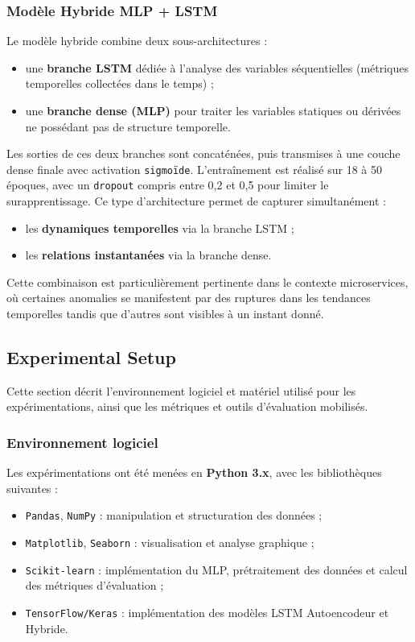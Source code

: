 \documentclass[conference]{IEEEtran}
\begin{document}
\subsubsection{Modèle Hybride MLP + LSTM}
Le modèle hybride combine deux sous-architectures :
\begin{itemize}
    \item une \textbf{branche LSTM} dédiée à l’analyse des variables séquentielles (métriques temporelles collectées dans le temps) ;
    \item une \textbf{branche dense (MLP)} pour traiter les variables statiques ou dérivées ne possédant pas de structure temporelle.
\end{itemize}
Les sorties de ces deux branches sont concaténées, puis transmises à une couche dense finale avec activation \texttt{sigmoïde}.
L’entraînement est réalisé sur 18 à 50 époques, avec un \texttt{dropout} compris entre 0,2 et 0,5 pour limiter le surapprentissage.
Ce type d’architecture permet de capturer simultanément :
\begin{itemize}
    \item les \textbf{dynamiques temporelles} via la branche LSTM ;
    \item les \textbf{relations instantanées} via la branche dense.
\end{itemize}
Cette combinaison est particulièrement pertinente dans le contexte microservices, où certaines anomalies se manifestent par des ruptures dans les tendances temporelles tandis que d’autres sont visibles à un instant donné.

\subsection{Experimental Setup}

Cette section décrit l’environnement logiciel et matériel utilisé pour les expérimentations, ainsi que les métriques et outils d’évaluation mobilisés.

\subsubsection{Environnement logiciel}
Les expérimentations ont été menées en \textbf{Python 3.x}, avec les bibliothèques suivantes :
\begin{itemize}
    \item \texttt{Pandas}, \texttt{NumPy} : manipulation et structuration des données ;
    \item \texttt{Matplotlib}, \texttt{Seaborn} : visualisation et analyse graphique ;
    \item \texttt{Scikit-learn} : implémentation du MLP, prétraitement des données et calcul des métriques d’évaluation ;
    \item \texttt{TensorFlow/Keras} : implémentation des modèles LSTM Autoencodeur et Hybride.
\end{itemize}
\end{document}
